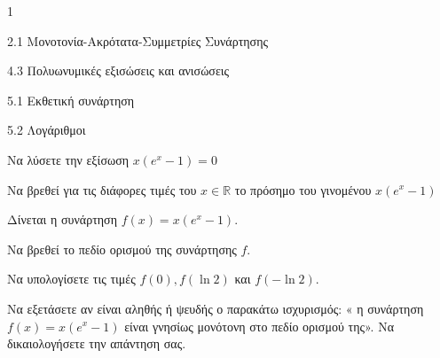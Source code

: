 \begin{ylh}{1}
\item 2.1 Μονοτονία-Ακρότατα-Συμμετρίες Συνάρτησης
\item 4.3 Πολυωνυμικές εξισώσεις και ανισώσεις
\item 5.1 Εκθετική συνάρτηση
\item 5.2 Λογάριθμοι
\end{ylh}
\begin{alist}
\item
\end{alist}
\begin{alist}
\item
  Να λύσετε την εξίσωση $x(e^x - 1) = 0$
\end{alist}
\begin{alist}
\item
  Να βρεθεί για τις διάφορες τιμές του $x \in \mathbb{R}$ το πρόσημο του γινομένου $x(e^x - 1)$
\item Δίνεται η συνάρτηση $f(x) = x(e^x - 1)$.
\end{alist}
\begin{alist}
\item
  Να βρεθεί το πεδίο ορισμού της συνάρτησης $f$.
\end{alist}
\begin{alist}
\item
  Να υπολογίσετε τις τιμές $f(0), f(\ln 2)$ και $f(-\ln 2)$.
\end{alist}
\begin{alist}
\item
  Να εξετάσετε αν είναι αληθής ή ψευδής ο παρακάτω ισχυρισμός: « η συνάρτηση $f(x) = x(e^x - 1)$ είναι γνησίως μονότονη στο πεδίο ορισμού της». Να δικαιολογήσετε την απάντηση σας.
\end{alist}

